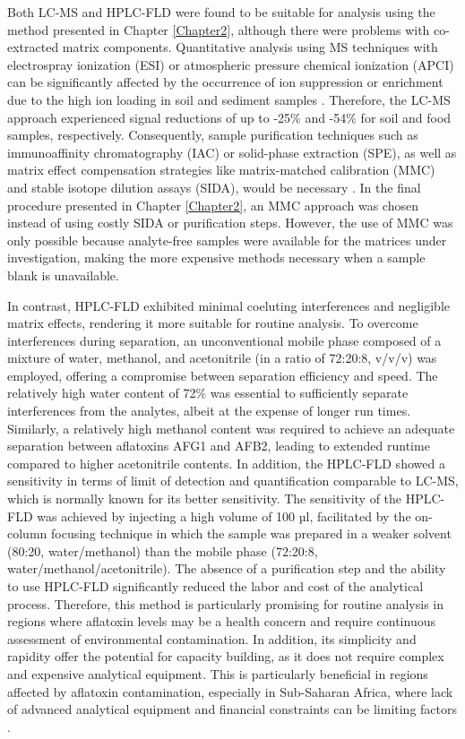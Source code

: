 Both LC-MS and HPLC-FLD were found to be suitable for analysis using the method presented in Chapter \ref{Chapter2}, although there were problems with co-extracted matrix components. Quantitative analysis using MS techniques with electrospray ionization (ESI) or atmospheric pressure chemical ionization (APCI) can be significantly affected by the occurrence of ion suppression or enrichment due to the high ion loading in soil and sediment samples \citep{trufelli2011overview}. Therefore, the LC-MS approach experienced signal reductions of up to -25\% and -54\% for soil and food samples, respectively. Consequently, sample purification techniques such as immunoaffinity chromatography (IAC) or solid-phase extraction (SPE), as well as matrix effect compensation strategies like matrix-matched calibration (MMC) and stable isotope dilution assays (SIDA), would be necessary \citep{shephard2009aflatoxin, razzazi2011sample}. In the final procedure presented in Chapter \ref{Chapter2}, an MMC approach was chosen instead of using costly SIDA or purification steps. However, the use of MMC was only possible because analyte-free samples were available for the matrices under investigation, making the more expensive methods necessary when a sample blank is unavailable.


In contrast, HPLC-FLD exhibited minimal coeluting interferences and negligible matrix effects, rendering it more suitable for routine analysis. To overcome interferences during separation, an unconventional mobile phase composed of a mixture of water, methanol, and acetonitrile (in a ratio of 72:20:8, v/v/v) was employed, offering a compromise between separation efficiency and speed. The relatively high water content of 72\% was essential to sufficiently separate interferences from the analytes, albeit at the expense of longer run times. Similarly, a relatively high methanol content was required to achieve an adequate separation between aflatoxins AFG1 and AFB2, leading to extended runtime compared to higher acetonitrile contents. In addition, the HPLC-FLD showed a sensitivity in terms of limit of detection and quantification comparable to LC-MS, which is normally known for its better sensitivity. The sensitivity of the HPLC-FLD was achieved by injecting a high volume of 100 µl, facilitated by the on-column focusing technique \citep{vissers1996optimised, mills1997assessment, groskreutz2015quantitative} in which the sample was prepared in a weaker solvent (80:20, water/methanol) than the mobile phase (72:20:8, water/methanol/acetonitrile). The absence of a purification step and the ability to use HPLC-FLD significantly reduced the labor and cost of the analytical process. Therefore, this method is particularly promising for routine analysis in regions where aflatoxin levels may be a health concern and require continuous assessment of environmental contamination. In addition, its simplicity and rapidity offer the potential for capacity building, as it does not require complex and expensive analytical equipment. This is particularly beneficial in regions affected by aflatoxin contamination, especially in Sub-Saharan Africa, where lack of advanced analytical equipment and financial constraints can be limiting factors \citep{gnonlonfin2013review}.

